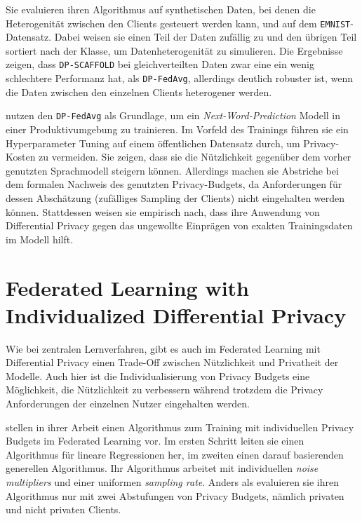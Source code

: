 Sie evaluieren ihren Algorithmus auf synthetischen Daten, bei denen die Heterogenität zwischen den Clients gesteuert werden kann, und auf dem \texttt{EMNIST}-Datensatz. Dabei weisen sie einen Teil der Daten zufällig zu und den übrigen Teil sortiert nach der Klasse, um Datenheterogenität zu simulieren. Die Ergebnisse zeigen, dass \texttt{DP-SCAFFOLD} bei gleichverteilten Daten zwar eine ein wenig schlechtere Performanz hat, als \texttt{DP-FedAvg}, allerdings deutlich robuster ist, wenn die Daten zwischen den einzelnen Clients heterogener werden.

\textcite{ramaswamy:2020} nutzen den \texttt{DP-FedAvg} als Grundlage, um ein \textit{Next-Word-Prediction} Modell in einer Produktivumgebung zu trainieren. Im Vorfeld des Trainings führen sie ein Hyperparameter Tuning auf einem öffentlichen Datensatz durch, um Privacy-Kosten zu vermeiden. Sie zeigen, dass sie die Nützlichkeit gegenüber dem vorher genutzten Sprachmodell steigern können. Allerdings machen sie Abstriche bei dem formalen Nachweis des genutzten Privacy-Budgets, da Anforderungen für dessen Abschätzung (zufälliges Sampling der Clients) nicht eingehalten werden können\cite{wang:2020}. Stattdessen weisen sie empirisch nach, dass ihre Anwendung von Differential Privacy gegen das ungewollte Einprägen von exakten Trainingsdaten im Modell hilft.


\section{Federated Learning with Individualized Differential Privacy}\label{sec:rw-flidp}

Wie bei zentralen Lernverfahren, gibt es auch im Federated Learning mit Differential Privacy einen Trade-Off zwischen Nützlichkeit und Privatheit der Modelle. Auch hier ist die Individualisierung von Privacy Budgets eine Möglichkeit, die Nützlichkeit zu verbessern während trotzdem die Privacy Anforderungen der einzelnen Nutzer eingehalten werden.

\textcite{aldaghri:2023} stellen in ihrer Arbeit einen Algorithmus zum Training mit individuellen Privacy Budgets im Federated Learning vor. Im ersten Schritt leiten sie einen Algorithmus für lineare Regressionen her, im zweiten einen darauf basierenden generellen Algorithmus. Ihr Algorithmus arbeitet mit individuellen \textit{noise multipliers} und einer uniformen \textit{sampling rate}. Anders als \citeauthor{boenisch:2023} evaluieren sie ihren Algorithmus nur mit zwei Abstufungen von Privacy Budgets, nämlich privaten und nicht privaten Clients.

